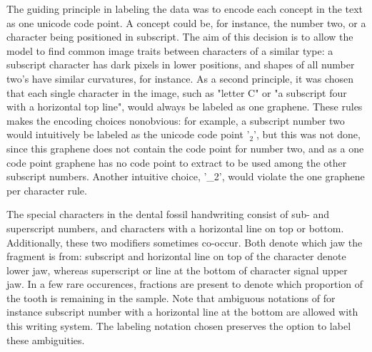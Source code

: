 \documentclass{article}
\begin{document}
The guiding principle in labeling the data was to encode each concept in the text as one unicode code point. A concept could be, for 
instance, the number two, or a character being positioned in subscript. The aim of this decision is to allow the model 
to find common image traits between characters of a similar type: a subscript character has dark pixels in lower positions, and shapes of all 
number two's have similar curvatures, for instance. As a second principle, it was chosen that each single character in the image, such as "letter C" 
or "a subscript four with a horizontal top line", would always be labeled as one graphene. 
These rules makes the encoding choices nonobvious: for example, 
a subscript number two would intuitively be labeled as the unicode code point '$_2$', but this was not done, 
since this graphene does not contain the code point for number two, 
and as a one code point graphene has no code point to extract to be used among the other subscript numbers.
Another intuitive choice, '\_2', would violate the one graphene per character rule.

The special characters in the dental fossil handwriting consist of sub- and superscript numbers, and characters with a horizontal line on 
top or bottom. Additionally, these two modifiers sometimes co-occur. Both denote which jaw the fragment is from: 
subscript and horizontal line on top of the character denote lower jaw, whereas superscript or line at the bottom of character 
signal upper jaw. In a few rare occurences, fractions are present 
to denote which proportion of the tooth is remaining in the sample. 
Note that ambiguous notations of for instance subscript number with a horizontal line at the bottom are allowed with this writing system.
The labeling notation chosen preserves the option to label these ambiguities.

\end{document}
